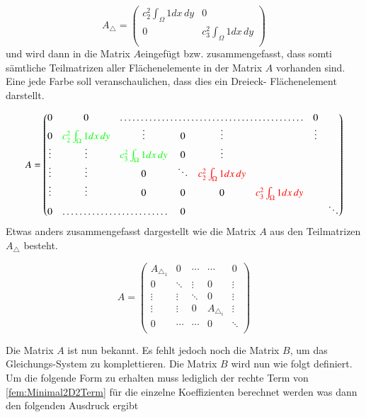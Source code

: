 \begin{equation}
	A_{\triangle} = \left( \begin{array}{cc}
	c_2^2 \int_{\Omega} 1 dx \, dy & 0  \\ 
	0 & c_3^2 \int_{\Omega} 1 dx \, dy  \\
	\end{array}\right)
	\label{fem:TeilmatrixA}
\end{equation}
und wird dann in die Matrix $A $eingefügt bzw. zusammengefasst, dass  somti sämtliche Teilmatrizen aller Flächenelemente in der Matrix $A$ vorhanden sind. Eine jede Farbe soll veranschaulichen, dass dies ein Dreieck- Flächenelement darstellt.

\begin{equation}
 A = \begin{pmatrix} 0 & 0 & \hdotsfor{4} & 0 \\
	0 & \textcolor{green}{ c_2^2 \int_{\Omega} 1 dx \, dy }& \vdots & 0 & \vdots & & \vdots \\
	\vdots & \vdots & \textcolor{green}{c_3^2 \int_{\Omega} 1 dx \, dy }& 0 & \vdots  & & \\
	\vdots & \vdots & 0 & \ddots & \textcolor{red}{ c_2^2 \int_{\Omega} 1 dx \, dy }& & \\
	\vdots & \vdots & 0 & 0 & 0 & \textcolor{red}{c_3^2 \int_{\Omega} 1 dx \, dy} & \\
	0 & \hdotsfor{2} & 0 &  & & &  \ddots  \\
	\end{pmatrix}
	\label{fem:MatrixA}
\end{equation}
Etwas anders zusammengefasst dargestellt wie die Matrix $A$ aus den Teilmatrizen $A_{\triangle}$ besteht.

\begin{equation}
 A =	\begin{pmatrix}
	A_{\triangle_1} & 0 & \cdots & \cdots & 0 \\
	0 & \ddots & \vdots & 0 & \vdots \\
	\vdots & \vdots & \ddots & 0 & \vdots \\
	\vdots & \vdots & 0 & A_{\triangle_i} & \vdots \\
	0 & \cdots & \cdots & 0 &  \ddots \\
	\end{pmatrix}
\end{equation}

Die Matrix $A$ ist nun bekannt. Es fehlt jedoch noch die Matrix $B$, um das Gleichungs-System zu komplettieren. Die Matrix $B$ wird nun wie folgt definiert. Um die folgende Form zu erhalten muss lediglich der rechte Term von \ref{fem:Minimal2D2Term} für die einzelne Koeffizienten berechnet werden was dann den folgenden Ausdruck ergibt

